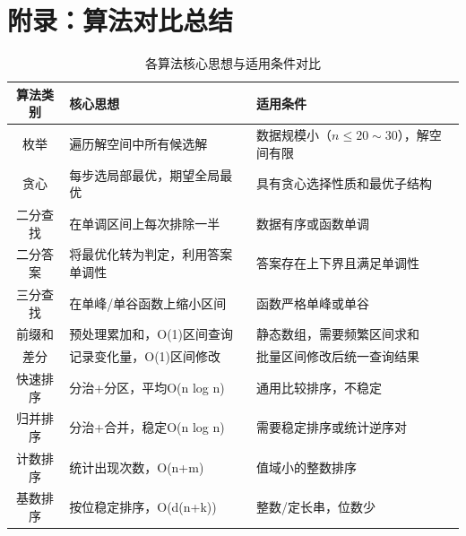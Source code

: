 \documentclass[12pt,a4paper]{ctexart}
\begin{document}
\newpage
\section*{附录：算法对比总结}

\begin{table}[h]
    \centering
    \caption{各算法核心思想与适用条件对比}
    \begin{tabularx}{\textwidth}{cXX}
        \toprule
        \textbf{算法类别} & \textbf{核心思想} & \textbf{适用条件} \\
        \midrule
        枚举 & 遍历解空间中所有候选解 & 数据规模小（$n\le 20\sim30$），解空间有限 \\
        \midrule
        贪心 & 每步选局部最优，期望全局最优 & 具有贪心选择性质和最优子结构 \\
        \midrule
        二分查找 & 在单调区间上每次排除一半 & 数据有序或函数单调 \\
        \midrule
        二分答案 & 将最优化转为判定，利用答案单调性 & 答案存在上下界且满足单调性 \\
        \midrule
        三分查找 & 在单峰/单谷函数上缩小区间 & 函数严格单峰或单谷 \\
        \midrule
        前缀和 & 预处理累加和，O(1)区间查询 & 静态数组，需要频繁区间求和 \\
        \midrule
        差分 & 记录变化量，O(1)区间修改 & 批量区间修改后统一查询结果 \\
        \midrule
        快速排序 & 分治+分区，平均O(n log n) & 通用比较排序，不稳定 \\
        \midrule
        归并排序 & 分治+合并，稳定O(n log n) & 需要稳定排序或统计逆序对 \\
        \midrule
        计数排序 & 统计出现次数，O(n+m) & 值域小的整数排序 \\
        \midrule
        基数排序 & 按位稳定排序，O(d(n+k)) & 整数/定长串，位数少 \\
        \bottomrule
    \end{tabularx}
\end{table}
\end{document}
